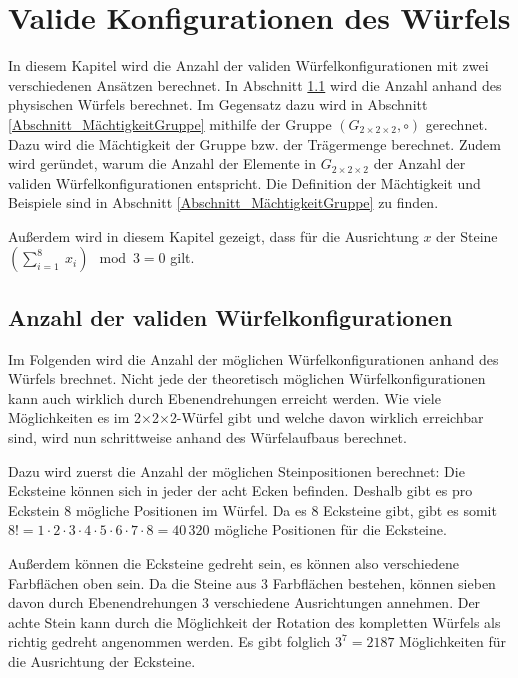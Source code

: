 \documentclass[12pt,a4paper, usenames, dvipsnames]{article}
\theoremstyle{mystyle}
\theoremstyle{definition}
\newcommand{\Gtwo}{\ensuremath{G_{2\times 2\times 2}}}
\newcommand{\Ttwo}{2$\times$2$\times$2-}
\begin{document}
%
%
%
%
%
%
%
%
%
%
%
%
%
%
%
%
%
\newpage

\section{Valide Konfigurationen des Würfels}

\label{Kapitel_ValideKonfigurationen}

In diesem Kapitel wird die Anzahl der validen Würfelkonfigurationen mit zwei verschiedenen Ansätzen berechnet. In Abschnitt \ref{Abschnitt_AnzahlKonfigurationen} wird die Anzahl anhand des physischen Würfels berechnet. Im Gegensatz dazu wird in Abschnitt \ref{Abschnitt_MächtigkeitGruppe} mithilfe der Gruppe $(\Gtwo,\circ)$ gerechnet. Dazu wird die Mächtigkeit der Gruppe bzw. der Trägermenge berechnet. Zudem wird geründet, warum die Anzahl der Elemente in $\Gtwo$ der Anzahl der validen Würfelkonfigurationen entspricht.
Die Definition der Mächtigkeit und Beispiele sind in Abschnitt \ref{Abschnitt_MächtigkeitGruppe} zu finden. 


Außerdem wird in diesem Kapitel gezeigt, dass für die Ausrichtung $x$ der Steine $( \sum_{i= 1}^{8} \ x_i ) \mod 3 = 0$ gilt.

%
%
%
%
%
%
%
%
%
%
%
%
%
%
%
%
%
%
%
\subsection{Anzahl der validen Würfelkonfigurationen}
\label{Abschnitt_AnzahlKonfigurationen}

Im Folgenden wird die Anzahl der möglichen Würfelkonfigurationen anhand des Würfels brechnet. Nicht jede der theoretisch möglichen Würfelkonfigurationen kann auch wirklich durch Ebenendrehungen erreicht werden. Wie viele Möglichkeiten es im \Ttwo Würfel gibt und welche davon wirklich erreichbar sind, wird nun schrittweise anhand des Würfelaufbaus berechnet. 

Dazu wird zuerst die Anzahl der möglichen Steinpositionen berechnet:
Die Ecksteine können sich in jeder der acht Ecken befinden. Deshalb gibt es pro Eckstein 8 mögliche Positionen im Würfel. Da es 8 Ecksteine gibt, gibt es somit $8! = 1 \cdot 2 \cdot 3 \cdot 4 \cdot 5 \cdot 6 \cdot 7 \cdot 8 = 40\, 320$ mögliche Positionen für die Ecksteine. 

Außerdem können die Ecksteine gedreht sein, es können also verschiedene Farbflächen oben sein. Da die Steine aus 3 Farbflächen bestehen, können sieben davon durch Ebenendrehungen 3 verschiedene Ausrichtungen annehmen. Der achte Stein kann durch die Möglichkeit der Rotation des kompletten Würfels als richtig gedreht angenommen werden. Es gibt folglich $3^7 = 2187$ Möglichkeiten für die Ausrichtung der Ecksteine.
\end{document}
